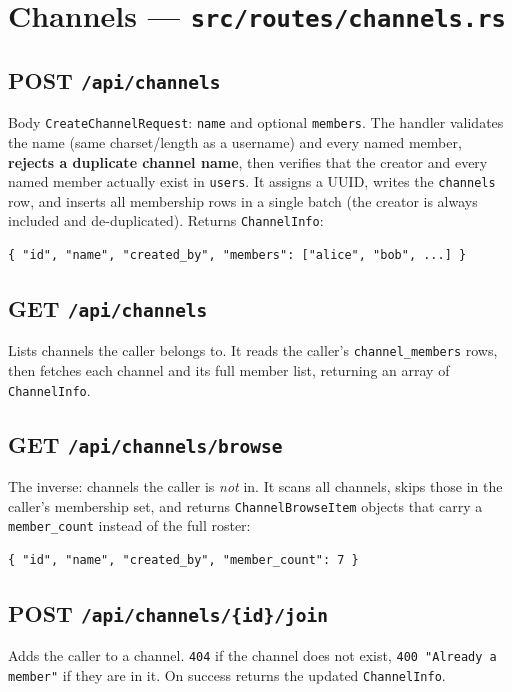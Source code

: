 \section{Channels --- \texttt{src/routes/channels.rs}}

\subsection*{POST \texttt{/api/channels}}
Body \verb|CreateChannelRequest|: \verb|name| and optional \verb|members|. The
handler validates the name (same charset/length as a username) and every named
member, \textbf{rejects a duplicate channel name}, then verifies that the creator
and every named member actually exist in \verb|users|. It assigns a UUID, writes
the \verb|channels| row, and inserts all membership rows in a single batch (the
creator is always included and de-duplicated). Returns \verb|ChannelInfo|:

\begin{lstlisting}
{ "id", "name", "created_by", "members": ["alice", "bob", ...] }
\end{lstlisting}

\subsection*{GET \texttt{/api/channels}}
Lists channels the caller belongs to. It reads the caller's \verb|channel_members|
rows, then fetches each channel and its full member list, returning an array of
\verb|ChannelInfo|.

\subsection*{GET \texttt{/api/channels/browse}}
The inverse: channels the caller is \emph{not} in. It scans all channels, skips
those in the caller's membership set, and returns \verb|ChannelBrowseItem|
objects that carry a \verb|member_count| instead of the full roster:

\begin{lstlisting}
{ "id", "name", "created_by", "member_count": 7 }
\end{lstlisting}

\subsection*{POST \texttt{/api/channels/\{id\}/join}}
Adds the caller to a channel. \verb|404| if the channel does not exist,
\verb|400 "Already a member"| if they are in it. On success returns the updated
\verb|ChannelInfo|.

